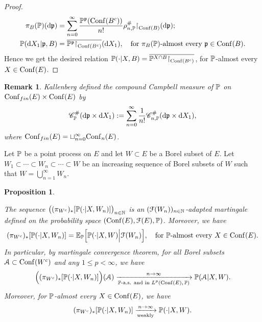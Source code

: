 \documentclass[12pt]{paper}
\newtheorem{proposition}[theorem]{Proposition}
\newtheorem*{remark*}{Remark}
\numberwithin{theorem}{section}
\numberwithin{figure}{section}
\numberwithin{equation}{section}
\begin{document}
\begin{proof}
\begin{align}
\pi_B(\mathbb{P}) (\mathrm{d} \mathfrak{p})  &=  \sum_{n=0}^\infty  \frac{\mathbb{P}^{\mathfrak{p}}(\mathrm{Conf}(B^c))  }{n!} \rho_{n, \mathbb{P}}^\#\mathord{\upharpoonright}_{\mathrm{Conf}(B)}(\mathrm{d} \mathfrak{p}) ; \label{restriction-correlation}
\\
  \mathbb{P}(\mathrm{d} X_1 |\mathfrak{p}, B) &= \overline{\mathbb{P}^{\mathfrak{p}}\mathord{\upharpoonright}_{\mathrm{Conf}(B^c)}} ( \mathrm{d}  X_1), \quad \text{for $\pi_B(\mathbb{P})$-almost every $\mathfrak{p} \in \mathrm{Conf}(B)$}.
\end{align}
Hence we get the desired relation $\mathbb{P}(\cdot |X, B) = \overline{\mathbb{P}^{X \cap B}\mathord{\upharpoonright}_{\mathrm{Conf}(B^c)}}$, for $\mathbb{P}$-almost every $X \in \mathrm{Conf}(E)$.
\end{proof}


\begin{remark*}
Kallenberg \cite[Section 12.3]{Kallenberg} defined the {\it compound Campbell} measure of $\mathbb{P}$  on $\mathrm{Conf}_{fin}(E)\times \mathrm{Conf}(E)$ by
\[
\mathscr{C}_{\mathbb{P}}^\# (\mathrm{d} \mathfrak{p} \times \mathrm{d} X_1): =\sum_{n=0}^\infty \frac{1}{n!}\mathscr{C}_{n, \mathbb{P}}^\#(\mathrm{d} \mathfrak{p} \times \mathrm{d} X_1),
\]
where $\mathrm{Conf}_{fin}(E) = \sqcup_{n=0}^\infty \mathrm{Conf}_{n}(E)$.
\end{remark*}



Let $\mathbb{P}$ be a point process on $E$ and let $W \subset E$ be a Borel subset of $E$.
Let $W_1 \subset \cdots \subset W_n \subset \cdots \subset W$ be an increasing sequence of Borel subsets of $W$ such that $W  = \bigcup_{n=1}^\infty W_n.$

\begin{proposition}\label{prop-mart-measure}

  The sequence $\big(  ( \pi_{W^c})_{*}[\mathbb{P}(\cdot| X, W_n)]\big)_{n\in\mathbb{N}}$ is an $(\mathcal{F}(W_n))_{n\in\mathbb{N}}$-adapted martingale defined on the probability space $(\mathrm{Conf}(E), \mathcal{F}(E), \mathbb{P})$. Moreover, we have
\begin{align}\label{cond-meas-mart}
 (\pi_{W^c})_{*}[\mathbb{P}(\cdot |X,  W_n)] = \mathbb{E}_{\mathbb{P}}\Big[\mathbb{P}(\cdot| X, W) \Big| \mathcal{F}(W_n) \Big], \quad \text{for $\mathbb{P}$-almost every $X\in \mathrm{Conf}(E)$.}
\end{align}
In particular, by martingale convergence theorem,  for all Borel subsets $\mathcal{A} \subset \mathrm{Conf}(W^c)$ and any $1\le p < \infty$,   we have
\begin{align}\label{cond-mart}
\Big(( \pi_{W^c})_{*}[\mathbb{P}(\cdot |X,  W_n)] \Big)  (\mathcal{A})  \xrightarrow[\text{$\mathbb{P}$-a.s. and in $L^p(\mathrm{Conf}(E), \mathbb{P})$} ]{n\to\infty} \mathbb{P} (\mathcal{A}| X, W).
\end{align}
Moreover,  for $\mathbb{P}$-almost every $X\in \mathrm{Conf}(E)$, we have
\begin{align}\label{cond-mart-weak}
(\pi_{W^c})_{*}[\mathbb{P}(\cdot |X,  W_n)]   \xrightarrow[\text{weakly}]{n\to\infty} \mathbb{P} (\cdot | X, W).
\end{align}
\end{proposition}
\end{document}
